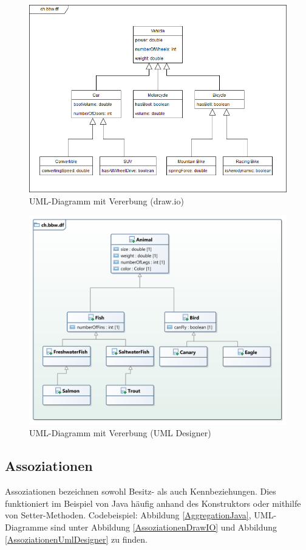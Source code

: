 \documentclass[a4paper, titlepage]{scrartcl}
\begin{document}
    \begin{figure}
        \includegraphics[width=\textwidth]{Klassendiagramm1a}
        \caption{UML-Diagramm mit Vererbung (draw.io)}
        \label{VererbungDrawIO}
    \end{figure}
    \begin{figure}
        \includegraphics[width=\textwidth]{Klassendiagramm1b}
        \caption{UML-Diagramm mit Vererbung (UML Designer)}
        \label{VererbungUmlDesigner}
    \end{figure}
    
    \subsection{Assoziationen}
    Assoziationen bezeichnen sowohl Besitz- als auch Kennbeziehungen.
    Dies funktioniert im Beispiel von Java häufig anhand des Konstruktors
    oder mithilfe von Setter-Methoden. Codebeispiel: Abbildung \ref{AggregationJava},
    UML-Diagramme sind unter Abbildung \ref{AssoziationenDrawIO} und
    Abbildung \ref{AssoziationenUmlDesigner} zu finden.
\end{document}
